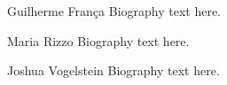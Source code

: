 \documentclass[10pt,journal,compsoc]{IEEEtran}
\begin{document}
\ifCLASSOPTIONcaptionsoff
  \newpage
\fi





%
%
%



%



% 

\begin{IEEEbiography}{Guilherme Fran\c ca}
Biography text here.
\end{IEEEbiography}

\begin{IEEEbiographynophoto}{Maria Rizzo}
Biography text here.
\end{IEEEbiographynophoto}


\begin{IEEEbiographynophoto}{Joshua Vogelstein}
Biography text here.
\end{IEEEbiographynophoto}






\end{document}
